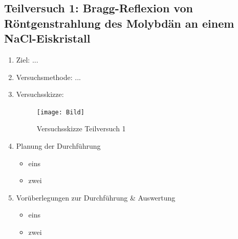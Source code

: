 \documentclass{article}
\begin{document}
\subsection{Teilversuch 1: Bragg-Reflexion von Röntgenstrahlung des Molybdän an einem NaCl-Eiskristall}
\begin{enumerate}[label = (\Roman*)]
    \item Ziel: ...
    
    \item Versuchsmethode: ...
    
    \item Versuchsskizze:
    
        \begin{figure}[H]
        \centering
        \texttt{[image: Bild]}
        \caption{Versuchsskizze Teilversuch 1}
        \end{figure}

    \item Planung der Durchführung
        \begin{itemize}
            \item eins
            \item zwei
        \end{itemize}

    \item Vorüberlegungen zur Durchführung \& Auswertung
        \begin{itemize}
            \item eins
            \item zwei
        \end{itemize}
    
\end{enumerate}

\newpage
\end{document}
